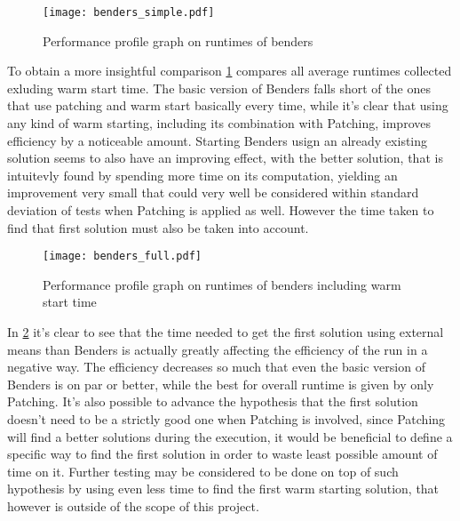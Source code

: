 
\begin{figure}[htbp]
	\centering 
	\texttt{[image: benders\_simple.pdf]}
	\caption{Performance profile graph on runtimes of benders \label{fig:bendersSimplePerfProf}}
\end{figure}

To obtain a more insightful comparison \figurename{ \ref{fig:bendersSimplePerfProf}} compares all average runtimes collected exluding warm start time.
The basic version of Benders falls short of the ones that use patching and warm start basically every time, while it's clear that using any kind of warm starting, including its combination with Patching, improves efficiency by a noticeable amount.
Starting Benders usign an already existing solution seems to also have an improving effect, with the better solution, that is intuitevly found by spending more time on its computation, yielding an improvement very small that could very well be considered within standard deviation of tests when Patching is applied as well.
However the time taken to find that first solution must also be taken into account.

\begin{figure}[htbp]
	\centering
	\texttt{[image: benders\_full.pdf]}
	\caption{Performance profile graph on runtimes of benders including warm start time \label{fig:bendersFullPerfProf}}
\end{figure}

In \figurename{ \ref{fig:bendersFullPerfProf}} it's clear to see that the time needed to get the first solution using external means than Benders is actually greatly affecting the efficiency of the run in a negative way.
The efficiency decreases so much that even the basic version of Benders is on par or better, while the best for overall runtime is given by only Patching.
It's also possible to advance the hypothesis that the first solution doesn't need to be a strictly good one when Patching is involved, since Patching will find a better solutions during the execution, it would be beneficial to define a specific way to find the first solution in order to waste least possible amount of time on it.
Further testing may be considered to be done on top of such hypothesis by using even less time to find the first warm starting solution, that however is outside of the scope of this project.

